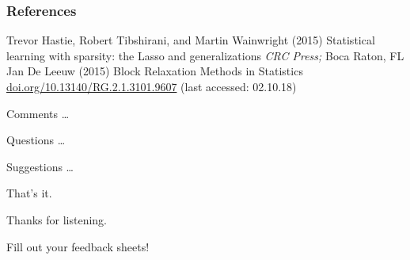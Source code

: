 \documentclass{beamer}
\begin{document}
\begin{frame}
\frametitle{References}
\footnotesize{
\begin{thebibliography}{99} %
 Trevor Hastie, Robert Tibshirani, and Martin Wainwright (2015)
\newblock Statistical learning with sparsity: the Lasso and
generalizations
\newblock \emph{CRC Press;} Boca Raton, FL%
 Jan De Leeuw (2015)
\newblock Block Relaxation Methods in Statistics
\newblock \url{doi.org/10.13140/RG.2.1.3101.9607} (last accessed: 02.10.18)
\end{thebibliography}
}
\end{frame}

\begin{frame}
\Huge{\centerline{Comments \dots}}
\Huge{\centerline{Questions \dots}}
\Huge{\centerline{Suggestions \dots}}
\end{frame}


\begin{frame}
\Huge{\centerline{That's it.}}
\Huge{\centerline{Thanks for listening.}}
\vspace{20pt}
\large{\centerline{Fill out your feedback sheets!}}
\end{frame}





\end{document}
